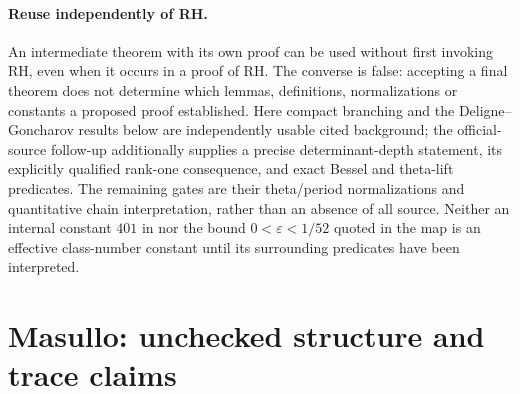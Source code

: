 \documentclass[11pt,a4paper]{article}
\theoremstyle{definition}
\begin{document}
\paragraph{Reuse independently of RH.}
An intermediate theorem with its own proof can be used without first invoking
RH, even when it occurs in a proof of RH.  The converse is false: accepting a
final theorem does not determine which lemmas, definitions, normalizations or
constants a proposed proof established.  Here compact branching and the
Deligne--Goncharov results below are independently usable cited background;
the official-source follow-up additionally supplies a precise determinant-depth
statement, its explicitly qualified rank-one consequence, and exact Bessel
and theta-lift predicates.  The remaining gates are their theta/period
normalizations and quantitative chain interpretation, rather than an absence
of all source.  Neither an internal constant
\(401\) in  nor the bound \(0<\varepsilon<1/52\) quoted in the map
is an effective class-number constant until its surrounding predicates have
been interpreted.



\section{Masullo: unchecked structure and trace claims}
\end{document}
